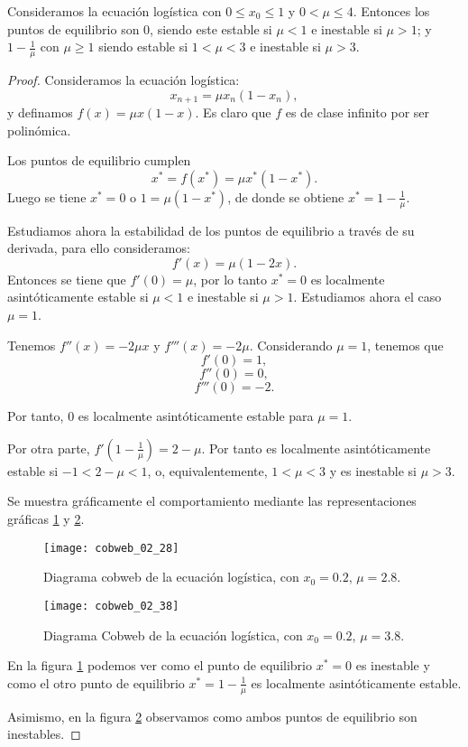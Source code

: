 \begin{proposition}
Consideramos la ecuación logística con $0\leq x_0\leq 1$ y $0< \mu\leq 4$. Entonces los puntos de equilibrio son $0$, siendo este estable si $\mu < 1$ e inestable si $\mu > 1$; y $1-\frac{1}{\mu}$ con $\mu\geq 1$ siendo estable si $1<\mu<3$ e inestable si $\mu > 3$.
\end{proposition}
\begin{proof}
Consideramos la ecuación logística:
$$x_{n+1} = \mu x_n(1-x_n),$$
y definamos $f(x)=\mu x(1-x)$. Es claro que $f$ es de clase infinito por ser polinómica.

Los puntos de equilibrio cumplen
$$x^*=f(x^*)=\mu x^*(1-x^*).$$
Luego se tiene $x^*=0$ o $1=\mu (1-x^*)$, de donde se obtiene $x^*=1-\frac{1}{\mu}$.

Estudiamos ahora la estabilidad de los puntos de equilibrio a través de su derivada, para ello consideramos:
$$f'(x)=\mu (1-2x).$$
Entonces se tiene que $f'(0)=\mu$, por lo tanto $x^*=0$ es localmente asintóticamente estable si $\mu < 1$ e inestable si $\mu > 1$. Estudiamos ahora el caso $\mu = 1$.

Tenemos $f''(x)=-2\mu x$ y $f'''(x)=-2\mu$. Considerando $\mu =1$, tenemos que
$$f'(0)=1,$$
$$f''(0)=0,$$
$$f'''(0)=-2.$$

Por tanto, $0$ es localmente asintóticamente estable para $\mu = 1$.

Por otra parte, $f'\left(1-\frac{1}{\mu}\right) = 2-\mu$. Por tanto es localmente asintóticamente estable si $-1<2-\mu<1$, o, equivalentemente, $1<\mu < 3$ y es inestable si $\mu > 3$.

Se muestra gráficamente el comportamiento mediante las representaciones gráficas \ref{fig: cobweb_2.8} y \ref{fig: cobweb_3.8}.

\begin{figure}
\begin{center}
\caption{Diagrama cobweb de la ecuación logística, con $x_0=0.2$, $\mu=2.8$.}
\label{fig: cobweb_2.8}
\texttt{[image: cobweb\_02\_28]}
\end{center}
\end{figure}

\begin{figure}
\begin{center}
\caption{Diagrama Cobweb de la ecuación logística, con $x_0=0.2$, $\mu=3.8$.}
\label{fig: cobweb_3.8}
\texttt{[image: cobweb\_02\_38]}
\end{center}
\end{figure}

En la figura \ref{fig: cobweb_2.8} podemos ver como el punto de equilibrio $x^*=0$ es inestable y como el otro punto de equilibrio $x^*=1-\frac{1}{\mu}$ es localmente asintóticamente estable.

Asimismo, en la figura \ref{fig: cobweb_3.8} observamos como ambos puntos de equilibrio son inestables.

\end{proof}

